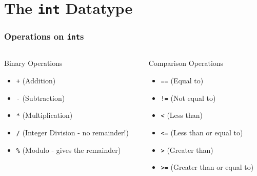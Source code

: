 \documentclass{beamer}
\begin{document}
\section{The \texttt{int} Datatype}

\begin{frame}
\frametitle{Operations on \texttt{int}s}
\begin{columns}[T]
    \begin{column}{0.5\textwidth}
        \begin{alertblock}{Binary Operations}
        \begin{itemize}
            \item \texttt{+} (Addition)
            \item \texttt{-} (Subtraction)
            \item \texttt{*} (Multiplication)
            \item \texttt{/} (Integer Division - no remainder!)
            \item \texttt{\%} (Modulo - gives the remainder)
        \end{itemize}
        \end{alertblock}
    \end{column}\pause
    \begin{column}{0.5\textwidth}
        \begin{exampleblock}{Comparison Operations}
        \begin{itemize}
            \item \texttt{==} (Equal to)
            \item \texttt{!=} (Not equal to)
            \item \texttt{<} (Less than)
            \item \texttt{<=} (Less than or equal to)
            \item \texttt{>} (Greater than)
            \item \texttt{>=} (Greater than or equal to)
        \end{itemize}
        \end{exampleblock}
    \end{column}
\end{columns}
\end{frame}
\end{document}
